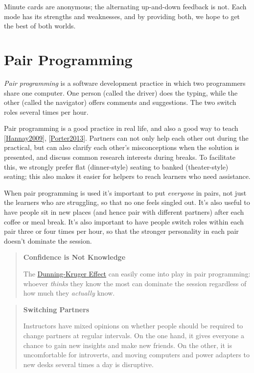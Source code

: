 \documentclass[10pt,statementpaper]{memoir}
\begin{document}
Minute cards are anonymous; the alternating up-and-down feedback is not.
Each mode has its strengths and weaknesses, and by providing both, we
hope to get the best of both worlds.

\section{Pair Programming}\label{pair-programming}

\emph{Pair programming} is a software development practice in which two
programmers share one computer. One person (called the driver) does the
typing, while the other (called the navigator) offers comments and
suggestions. The two switch roles several times per hour.

Pair programming is a good practice in real life, and also a good way to
teach {[}\href{biblio.html\#hannay-pairing}{Hannay2009}{]},
{[}\href{biblio.html\#porter-what-works}{Porter2013}{]}. Partners can
not only help each other out during the practical, but can also clarify
each other's misconceptions when the solution is presented, and discuss
common research interests during breaks. To facilitate this, we strongly
prefer flat (dinner-style) seating to banked (theater-style) seating;
this also makes it easier for helpers to reach learners who need
assistance.

When pair programming is used it's important to put \emph{everyone} in
pairs, not just the learners who are struggling, so that no one feels
singled out. It's also useful to have people sit in new places (and
hence pair with different partners) after each coffee or meal break.
It's also important to have people switch roles within each pair three
or four times per hour, so that the stronger personality in each pair
doesn't dominate the session.

\begin{quote}
\textbf{Confidence is Not Knowledge}

The
\href{https://en.wikipedia.org/wiki/Dunning\%E2\%80\%93Kruger_effect}{Dunning-Kruger
Effect} can easily come into play in pair programming: whoever
\emph{thinks} they know the most can dominate the session regardless of
how much they \emph{actually} know.
\end{quote}

\begin{quote}
\textbf{Switching Partners}

Instructors have mixed opinions on whether people should be required to
change partners at regular intervals. On the one hand, it gives everyone
a chance to gain new insights and make new friends. On the other, it is
uncomfortable for introverts, and moving computers and power adapters to
new desks several times a day is disruptive.
\end{quote}
\end{document}
